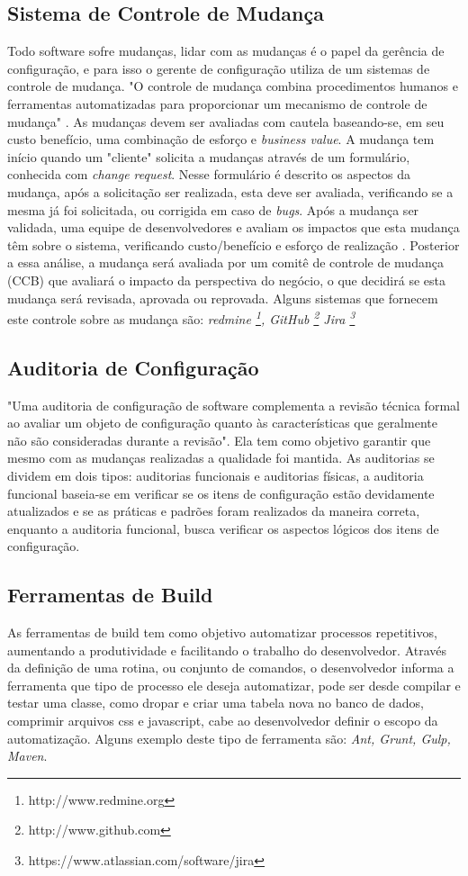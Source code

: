 \subsection{Sistema de Controle de Mudança}
Todo software sofre mudanças, lidar com as mudanças é o papel da gerência de configuração, e para isso o gerente de configuração utiliza de um sistemas de controle de mudança. "O controle de mudança combina procedimentos humanos e ferramentas automatizadas para proporcionar um mecanismo de controle de mudança" . As mudanças devem ser avaliadas com cautela baseando-se, em seu custo benefício, uma combinação de esforço e \textit{business value}. A mudança tem início quando um "cliente" solicita a mudanças através de um formulário, conhecida com \textit{change request}. Nesse formulário é descrito os aspectos da mudança, após a solicitação ser realizada, esta deve ser avaliada, verificando se a mesma já foi solicitada, ou corrigida em caso de \textit{bugs}. Após a mudança ser validada, uma equipe de desenvolvedores e avaliam os impactos que esta mudança têm sobre o sistema, verificando custo/benefício e esforço de realização \cite{sommerville2011}. Posterior a essa análise, a mudança será avaliada por um comitê de controle de mudança (CCB) que avaliará o impacto da perspectiva do negócio, o que decidirá se esta mudança será revisada, aprovada ou reprovada. Alguns sistemas que fornecem este controle sobre as mudança são: \textit{redmine \footnote{http://www.redmine.org}, GitHub \footnote{http://www.github.com} Jira \footnote{https://www.atlassian.com/software/jira}}
\subsection{Auditoria de Configuração}
"Uma auditoria de configuração de software complementa a revisão técnica formal ao avaliar um objeto de configuração quanto às características que geralmente não são consideradas durante a revisão"\space{}. Ela tem como objetivo garantir que mesmo com as mudanças realizadas a qualidade foi mantida. As auditorias se dividem em dois tipos: auditorias funcionais e auditorias físicas, a auditoria funcional baseia-se em verificar se os itens de configuração estão devidamente atualizados e se as práticas e padrões foram realizados da maneira correta, enquanto a auditoria funcional, busca verificar os aspectos lógicos dos itens de configuração.
\subsection{Ferramentas de Build}
As ferramentas de build tem como objetivo automatizar processos repetitivos, aumentando a produtividade e facilitando o trabalho do desenvolvedor. Através da definição de uma rotina, ou conjunto de comandos, o desenvolvedor informa a ferramenta que tipo de processo ele deseja automatizar, pode ser desde compilar e testar uma classe, como dropar e criar uma tabela nova no banco de dados, comprimir arquivos css e javascript, cabe ao desenvolvedor definir o escopo da automatização. Alguns exemplo deste tipo de ferramenta são: \textit{Ant, Grunt, Gulp, Maven}.


